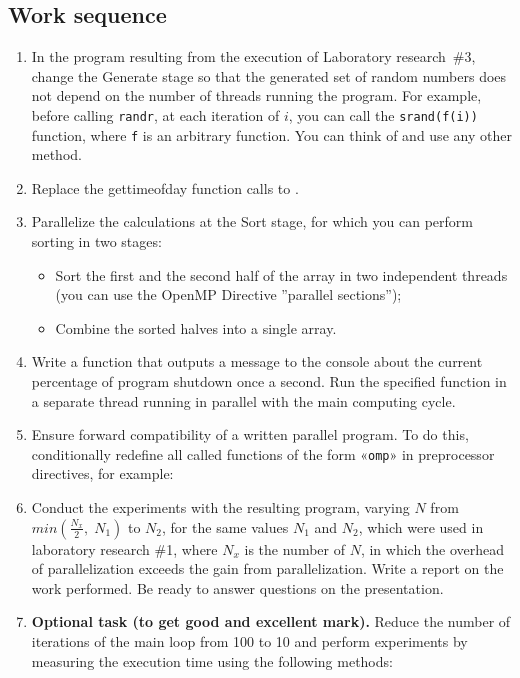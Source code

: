 { %
	\subsection{Work sequence}
	\begin{enumerate}
		\item	In the program resulting from the execution of Laboratory research~\#3, change the Generate stage so that the generated set of random numbers does not depend on the number of threads running the program. For example, before calling \texttt{rand\textunderscore r},  at each iteration of $i$, you can call the \texttt{srand(f(i))} function, where \texttt{f} is an arbitrary function. You can think of and use any other method.
		\item Replace the gettimeofday function calls to .
		\item Parallelize the calculations at the Sort stage, for which you can perform sorting in two stages:
			\begin{itemize}
				\item Sort the first and the second half of the array in two independent threads (you can use the OpenMP Directive ''parallel sections''); 
				\item Combine the sorted halves into a single array.
			\end{itemize}
		\item Write a function that outputs a message to the console about the current percentage of program shutdown once a second. Run the specified function in a separate thread running in parallel with the main computing cycle.
		\item Ensure forward compatibility of a written parallel program. To do this, conditionally redefine all called functions of the form «\texttt{omp\textunderscore *}» in preprocessor directives, for example:
			\begin{figure}[H]
				
			\end{figure}
		\item Conduct the experiments with the resulting program, varying $N$ from $min(\frac{N_x}{2},\;N_1)$ to $N_2$, for the same values $N_1$ and $N_2$, which were used in laboratory research \#1, where $N_x$ is the number of $N$, in which the overhead of parallelization exceeds the gain from parallelization. Write a report on the work performed. Be ready to answer questions on the presentation.
		\item\textbf{Optional task (to get good and excellent mark).} Reduce the number of iterations of the main loop from 100 to 10 and perform experiments by measuring the execution time using the following methods:

\end{enumerate}}

